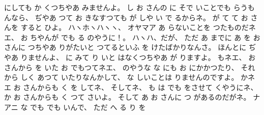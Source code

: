にしても
か
くつちやあ
みませんよ。
%
し
お
さんの
に
そで
いことでも
らうもんなら、
%
ぢやあ
つて
お
きなすつても
が
しや
い
で
るからネ。
%
が
て
て
お
さんを
すると
ひよ。
%
ハヽホヽハヽヽ、
%
オヤマア
あ
らないことを
つたものだネエ、
%
お
ちやんが
でも
る
のやうに！。
%
ハヽハ、だが、
%
ただ
あ
までに
あ
を
お
さんに
つちやあ
りがたいと
つてるといふ
を
けたばかりなんさ。
%
ほんとに
ぢやあ
りませんよ、
%
に
みて
り
いと
はなくつちやあ
が
りますよ。
%
もネエ、
%
お
さんから
を
いた
お
でもつてネエ、
%
のやうな
な
にも
お
にかかつたり、
%
それから
しく
あつて
いたりなんかして、
%
な
しいことは
りませんのですよ。
%
かネエ
お
さんからも
く
を
してネ、
%
そしてネ、
%
も
は
でも
をさせて
くやうにネ、
%
か
お
さんからも
く
つて
さいよ。
%
そして
あ
お
さんに
つ
があるのだがネ。
%
ナアニ
な
でも
でも
いんで、
%
ただ
へ
る
り
を
